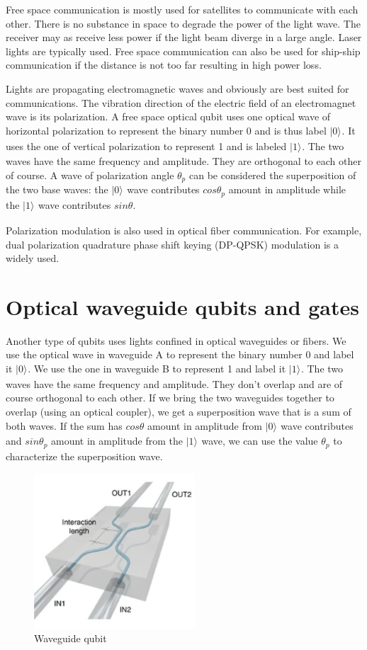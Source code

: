 \documentclass{book}
\newcommand{\keta}[2][]{\vert {#2} \rangle_{#1}}
\begin{document}
Free space communication is mostly used for satellites to communicate with each other. There is no substance in space to degrade the power of the light wave. The receiver may as receive less power if the light beam diverge in a large angle. Laser lights are typically used. Free space communication can also be used for ship-ship communication if the distance is not too far resulting in high power loss.

Lights are propagating electromagnetic waves and obviously are best suited for communications. The vibration direction of the electric field of an electromagnet wave is its polarization. A free space optical qubit uses one optical wave of horizontal polarization to represent the binary number 0 and is thus label $\keta{0}$. It uses the one of vertical polarization to represent 1 and is labeled $\keta{1}$. The two waves have the same frequency and amplitude. They are orthogonal to each other of course. A wave of polarization angle $\theta_p$ can be considered the superposition of the two base waves: the $\keta{0}$ wave contributes $cos\theta_p$ amount in amplitude while the $\keta{1}$ wave contributes $sin\theta$.

Polarization modulation is also used in optical fiber communication. For example, dual polarization quadrature phase shift keying (DP-QPSK) modulation is a widely used.

\section{Optical waveguide qubits and gates}
Another type of qubits uses lights confined in optical waveguides or fibers. We use the optical wave in waveguide A to represent the binary number 0 and label it $\keta{0}$. We use the one in waveguide B to represent 1 and label it $\keta{1}$. The two waves have the same frequency and amplitude. They don't overlap and are of course orthogonal to each other. If we bring the two waveguides together to overlap (using an optical coupler), we get a superposition wave that is a sum of both waves. If the sum has $cos\theta$ amount in amplitude from $\keta{0}$ wave contributes and $sin\theta_p$ amount in amplitude from the $\keta{1}$ wave, we can use the value $\theta_p$ to characterize the superposition wave.

\begin{figure}[ht]
\includegraphics[width=6cm]{pic/wguideQubit.png}
\caption{Waveguide qubit}
\label{Waveguide}
\end{figure}
\end{document}

